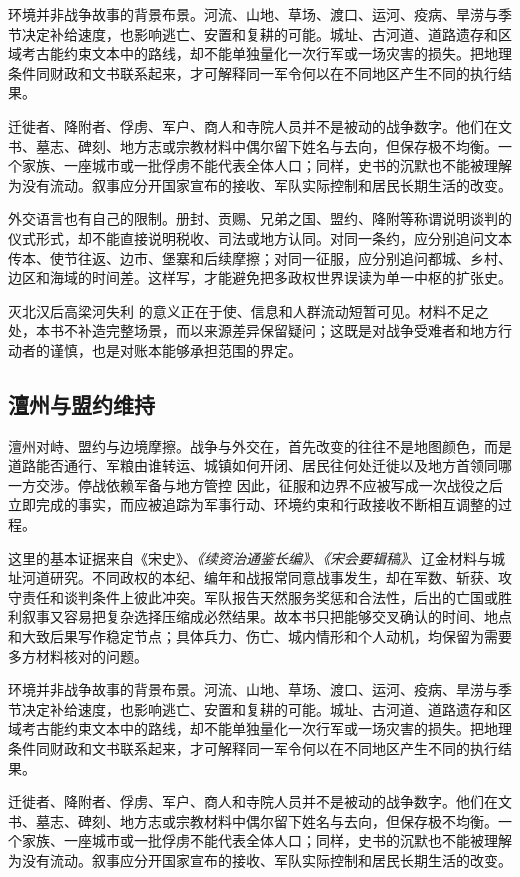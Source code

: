 环境并非战争故事的背景布景。河流、山地、草场、渡口、运河、疫病、旱涝与季节决定补给速度，也影响逃亡、安置和复耕的可能。城址、古河道、道路遗存和区域考古能约束文本中的路线，却不能单独量化一次行军或一场灾害的损失。把地理条件同财政和文书联系起来，才可解释同一军令何以在不同地区产生不同的执行结果。

迁徙者、降附者、俘虏、军户、商人和寺院人员并不是被动的战争数字。他们在文书、墓志、碑刻、地方志或宗教材料中偶尔留下姓名与去向，但保存极不均衡。一个家族、一座城市或一批俘虏不能代表全体人口；同样，史书的沉默也不能被理解为没有流动。叙事应分开国家宣布的接收、军队实际控制和居民长期生活的改变。

外交语言也有自己的限制。册封、贡赐、兄弟之国、盟约、降附等称谓说明谈判的仪式形式，却不能直接说明税收、司法或地方认同。对同一条约，应分别追问文本传本、使节往返、边市、堡寨和后续摩擦；对同一征服，应分别追问都城、乡村、边区和海域的时间差。这样写，才能避免把多政权世界误读为单一中枢的扩张史。

灭北汉后高梁河失利 的意义正在于使、信息和人群流动短暂可见。材料不足之处，本书不补造完整场景，而以来源差异保留疑问；这既是对战争受难者和地方行动者的谨慎，也是对账本能够承担范围的界定。

\subsection{澶州与盟约维持}

澶州对峙、盟约与边境摩擦。战争与外交在，首先改变的往往不是地图颜色，而是道路能否通行、军粮由谁转运、城镇如何开闭、居民往何处迁徙以及地方首领同哪一方交涉。停战依赖军备与地方管控 因此，征服和边界不应被写成一次战役之后立即完成的事实，而应被追踪为军事行动、环境约束和行政接收不断相互调整的过程。

这里的基本证据来自《宋史》、\textit{《续资治通鉴长编》}、\textit{《宋会要辑稿》}、辽金材料与城址河道研究。不同政权的本纪、编年和战报常同意战事发生，却在军数、斩获、攻守责任和谈判条件上彼此冲突。军队报告天然服务奖惩和合法性，后出的亡国或胜利叙事又容易把复杂选择压缩成必然结果。故本书只把能够交叉确认的时间、地点和大致后果写作稳定节点；具体兵力、伤亡、城内情形和个人动机，均保留为需要多方材料核对的问题。

环境并非战争故事的背景布景。河流、山地、草场、渡口、运河、疫病、旱涝与季节决定补给速度，也影响逃亡、安置和复耕的可能。城址、古河道、道路遗存和区域考古能约束文本中的路线，却不能单独量化一次行军或一场灾害的损失。把地理条件同财政和文书联系起来，才可解释同一军令何以在不同地区产生不同的执行结果。

迁徙者、降附者、俘虏、军户、商人和寺院人员并不是被动的战争数字。他们在文书、墓志、碑刻、地方志或宗教材料中偶尔留下姓名与去向，但保存极不均衡。一个家族、一座城市或一批俘虏不能代表全体人口；同样，史书的沉默也不能被理解为没有流动。叙事应分开国家宣布的接收、军队实际控制和居民长期生活的改变。

